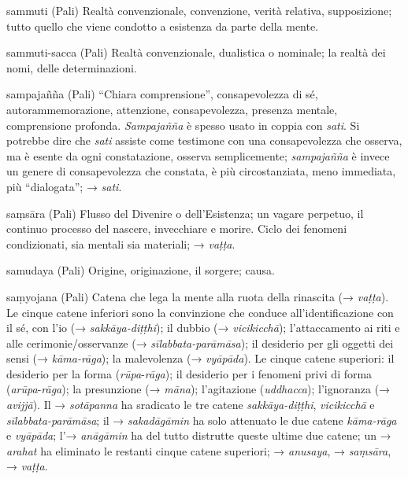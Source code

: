 \begin{glossarydescription}
\item[sammuti] (Pali) Realtà convenzionale, convenzione, verità relativa,
supposizione; tutto quello che viene condotto a esistenza da parte della
mente.

\item[sammuti-sacca] (Pali) Realtà convenzionale, dualistica o nominale; la
realtà dei nomi, delle determinazioni.

\item[sampajañña] (Pali) ``Chiara comprensione'', consapevolezza di sé,
autorammemorazione, attenzione, consapevolezza, presenza mentale,
comprensione profonda. \emph{Sampajañña} è spesso usato in coppia con
\emph{sati}. Si potrebbe dire che \emph{sati} assiste come testimone con
una consapevolezza che osserva, ma è esente da ogni constatazione,
osserva semplicemente; \emph{sampajañña} è invece un genere di
consapevolezza che constata, è più circostanziata, meno immediata, più
``dialogata''; → \emph{sati}.

\item[saṃsāra] (Pali) Flusso del Divenire o dell'Esistenza; un vagare
perpetuo, il continuo processo del nascere, invecchiare e morire. Ciclo
dei fenomeni condizionati, sia mentali sia materiali; → \emph{vaṭṭa}.

\item[samudaya] (Pali) Origine, originazione, il sorgere; causa.

\item[saṃyojana] (Pali) Catena che lega la mente alla ruota della rinascita (→
\emph{vaṭṭa}). Le cinque catene inferiori sono la convinzione che
conduce all'identificazione con il sé, con l'io (→
\emph{sakkāya-diṭṭhi}); il dubbio (→ \emph{vicikicchā}); l'attaccamento
ai riti e alle cerimonie/osservanze (→ \emph{sīlabbata-parāmāsa}); il
desiderio per gli oggetti dei sensi (→ \emph{kāma-rāga}); la malevolenza
(→ \emph{vyāpāda}). Le cinque catene superiori: il desiderio per la
forma (\emph{rūpa}-\emph{rāga}); il desiderio per i fenomeni privi di
forma (\emph{arūpa}-\emph{rāga}); la presunzione (→ \emph{māna});
l'agitazione (\emph{uddhacca}); l'ignoranza (→ \emph{avijjā}). Il →
\emph{sotāpanna} ha sradicato le tre catene \emph{sakkāya-diṭṭhi},
\emph{vicikicchā} e \emph{sīlabbata-parāmāsa}; il → \emph{sakadāgāmin}
ha solo attenuato le due catene \emph{kāma-rāga} e \emph{vyāpāda}; l'→
\emph{anāgāmin} ha del tutto distrutte queste ultime due catene; un →
\emph{arahat} ha eliminato le restanti cinque catene superiori; →
\emph{anusaya}, → \emph{saṃsāra}, → \emph{vaṭṭa}.


\end{glossarydescription}
